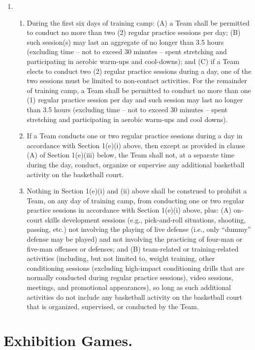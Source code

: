 \documentclass[
]{book}
\providecommand{\tightlist}{%
  \setlength{\itemsep}{0pt}\setlength{\parskip}{0pt}}
\begin{document}
\begin{enumerate}
\begin{enumerate}
  \end{enumerate}
\item
  \begin{enumerate}
  \def\labelenumii{(\roman{enumii})}
  \tightlist
  \item
    During the first six days of training camp: (A) a Team shall be permitted to conduct no more than two (2) regular practice sessions per day; (B) such session(s) may last an aggregate of no longer than 3.5 hours (excluding time -- not to exceed 30 minutes -- spent stretching and participating in aerobic warm-ups and cool-downs); and (C) if a Team elects to conduct two (2) regular practice sessions during a day, one of the two sessions must be limited to non-contact activities. For the remainder of training camp, a Team shall be permitted to conduct no more than one (1) regular practice session per day and such session may last no longer than 3.5 hours (excluding time -- not to exceed 30 minutes -- spent stretching and participating in aerobic warm-ups and cool downs).
  \item
    If a Team conducts one or two regular practice sessions during a day in accordance with Section 1(e)(i) above, then except as provided in clause (A) of Section 1(e)(iii) below, the Team shall not, at a separate time during the day, conduct, organize or supervise any additional basketball activity on the basketball court.
  \item
    Nothing in Section 1(e)(i) and (ii) above shall be construed to prohibit a Team, on any day of training camp, from conducting one or two regular practice sessions in accordance with Section 1(e)(i) above, plus:
    (A) on-court skills development sessions (e.g., pick-and-roll situations, shooting, passing, etc.) not involving the playing of live defense (i.e., only ``dummy'' defense may be played) and not involving the practicing of four-man or five-man offenses or defenses; and
    (B) team-related or training-related activities (including, but not limited to, weight training, other conditioning sessions (excluding high-impact conditioning drills that are normally conducted during regular practice sessions), video sessions, meetings, and promotional appearances), so long as such additional activities do not include any basketball activity on the basketball court that is organized, supervised, or conducted by the Team.
  \end{enumerate}
\end{enumerate}

\hypertarget{exhibition-games.}{%
\section{Exhibition Games.}\label{exhibition-games.}}
\end{document}
